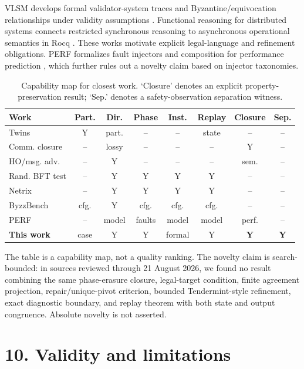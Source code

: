 VLSM develops formal validator-system traces and Byzantine/equivocation
relationships under validity assumptions \cite{barreto2022vlsm}.
Functional reasoning for distributed systems connects restricted
synchronous reasoning to asynchronous operational semantics in Rocq
\cite{ni2025functional}. These works motivate explicit legal-language
and refinement obligations. PERF formalizes fault injectors and
composition for performance prediction \cite{zhou2026perf}, which
further rules out a novelty claim based on injector taxonomies.

\begin{table}[t]
\centering
\scriptsize
\setlength{\tabcolsep}{2.5pt}
\begin{tabular}{lccccccc}
\toprule
Work & Part. & Dir. & Phase & Inst. & Replay & Closure & Sep.\\
\midrule
Twins & Y & part. & -- & -- & state & -- & --\\
Comm. closure & -- & lossy & -- & -- & -- & Y & --\\
HO/msg. adv. & -- & Y & -- & -- & -- & sem. & --\\
Rand. BFT test & -- & Y & Y & Y & Y & -- & --\\
Netrix & -- & Y & Y & Y & Y & -- & --\\
ByzzBench & cfg. & Y & cfg. & cfg. & cfg. & -- & --\\
PERF & -- & model & faults & model & model & perf. & --\\
\textbf{This work} & case & Y & Y & formal & Y & \textbf{Y} & \textbf{Y}\\
\bottomrule
\end{tabular}
\caption{Capability map for closest work. `Closure' denotes an explicit property-preservation result; `Sep.' denotes a safety-observation separation witness.}
\end{table}

The table is a capability map, not a quality ranking. The novelty claim
is search-bounded: in sources reviewed through 21 August 2026, we found
no result combining the same phase-erasure closure, legal-target
condition, finite agreement projection, repair/unique-pivot criterion,
bounded Tendermint-style refinement, exact diagnostic boundary, and
replay theorem with both state and output congruence. Absolute novelty
is not asserted.

\section{10. Validity and limitations}\label{validity-and-limitations}

